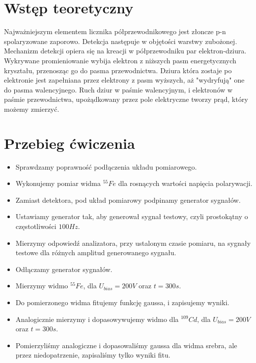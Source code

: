 \documentclass[11pt,a4paper]{article}
\begin{document}
\section{Wstęp teoretyczny}
Najważniejszym elementem licznika półprzewodnikowego jest złoncze p-n spolaryzowane zaporowo. Detekcja następuje w objętości warstwy zubożonej. Mechanizm detekcji opiera się na kreacji w półprzewodniku par elektron-dziura. Wykrywane promieniowanie wybija elektron z niższych pasm energetycznych kryształu, przenosząc go do pasma przewodnictwa. Dziura która zostaje po elektronie jest zapełniana przez elektrony z pasm wyższych, aż "wydryfują" one do pasma walencyjnego. Ruch dziur w paśmie walencyjnym, i elektronów w paśmie przewodnictwa, upożądkowany przez pole elektryczne tworzy prąd, który możemy zmierzyć.
\section{Przebieg ćwiczenia}
\begin{itemize}
\item Sprawdzamy poprawność podłączenia układu pomiarowego.
\item Wykonujemy pomiar widma $^{55}Fe$ dla rosnących wartości napięcia polarywacji.
\item Zamiast detektora, pod układ pomiarowy podpinamy generator sygnałów.
\item Ustawiamy generator tak, aby generował sygnał testowy, czyli prostokątny o częstotliwości $100Hz$.
\item Mierzymy odpowiedź analizatora, przy ustalonym czasie pomiaru, na sygnały testowe dla różnych amplitud generowanego sygnału.
\item Odłączamy generator sygnałów.
\item Mierzymy widmo $^{55}Fe$, dla $U_{bias} = 200V$ oraz $t=300s$.
\item Do pomierzonego widma fitujemy funkcję gaussa, i zapisujemy wyniki.
\item Analogicznie mierzymy i dopasowywujemy widmo dla $^{109}Cd$, dla $U_{bias} = 200V$ oraz $t=300s$.
\item Pomierzyliśmy analogiczne i dopasowaliśmy gaussa dla widma srebra, ale przez niedopatrzenie, zapisaliśmy tylko wyniki fitu.
\end{itemize}
\end{document}
